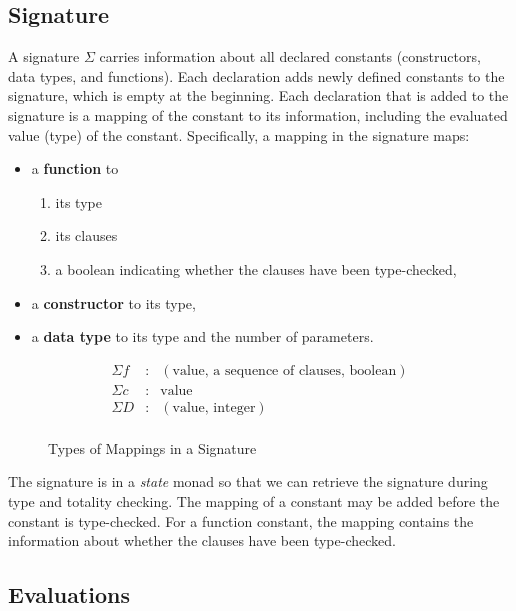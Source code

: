 \documentclass[acmsmall]{acmart}
\begin{document}
\subsection{Signature}
A signature $\Sigma$ carries information about all declared constants (constructors, data types, and functions). Each declaration adds newly defined constants to the signature, which is empty at the beginning. Each declaration that is added to the signature is a mapping of the constant to its information, including the evaluated value (type) of the constant. Specifically, a mapping in the signature maps:

\begin{itemize}
  \item a \textbf{function} to
        \begin{enumerate}
          \item its type
          \item its clauses
          \item a boolean indicating whether the clauses have been type-checked,
        \end{enumerate}
  \item a \textbf{constructor} to its type,
  \item a \textbf{data type} to its type and the number of parameters.
\end{itemize}

\begin{figure}[H]
  \begin{equation*}
    \begin{aligned}
      \Sigma f & : & (\textrm{value, a sequence of clauses, boolean}) \\
      \Sigma c & : & \textrm{value}                                   \\
      \Sigma D & : & (\textrm{value, integer})                        \\
    \end{aligned}
  \end{equation*}
  \caption{Types of Mappings in a Signature}
\end{figure}

The signature is in a \emph{state} monad so that we can retrieve the signature during type and totality checking. The mapping of a constant may be added before the constant is type-checked. For a function constant, the mapping contains the information about whether the clauses have been type-checked.

\subsection{Evaluations}
\label{sec:eval}
\end{document}
